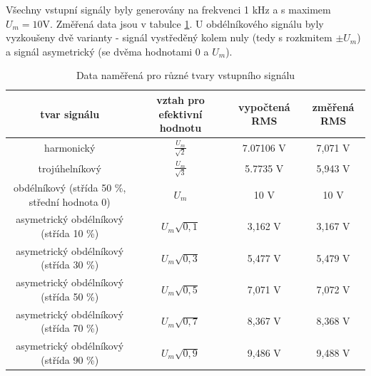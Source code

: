 \documentclass[twoside]{article}
\begin{document}
Všechny vstupní signály byly generovány na frekvenci 1 kHz a s maximem $U_m = 10 \si{\volt}$.
Změřená data jsou v tabulce \ref{tab:prubehy}. U obdélníkového signálu byly vyzkoušeny dvě
varianty - signál vystředěný kolem nuly (tedy s rozkmitem $\pm U_m$)
a signál asymetrický (se dvěma hodnotami 0 a $U_m$).

\begin{table}[h]
    \centering
    \begin{tabular}{c|c|c|c}
        tvar signálu & vztah pro efektivní hodnotu & vypočtená RMS & změřená RMS \\ \hline
        harmonický & $\frac{U_m}{\sqrt{2}}$ & 7.07106 \si{\volt} & 7,071 \si{\volt} \\
        trojúhelníkový & $\frac{U_m}{\sqrt{3}}$ & 5.7735 \si{\volt} & 5,943 \si{\volt} \\
        obdélníkový (střída 50 \%, střední hodnota 0) & $U_m$ & 10 \si{\volt} & 10 \si{\volt} \\
        asymetrický obdélníkový (střída 10 \%) & $U_m \sqrt{0,1}$ & 3,162 \si{\volt} & 3,167 \si{\volt} \\
        asymetrický obdélníkový (střída 30 \%) & $U_m \sqrt{0,3}$ & 5,477 \si{\volt} & 5,479 \si{\volt} \\
        asymetrický obdélníkový (střída 50 \%) & $U_m \sqrt{0,5}$ & 7,071 \si{\volt} & 7,072 \si{\volt} \\
        asymetrický obdélníkový (střída 70 \%) & $U_m \sqrt{0,7}$ & 8,367 \si{\volt} & 8,368 \si{\volt} \\
        asymetrický obdélníkový (střída 90 \%) & $U_m \sqrt{0,9}$ & 9,486 \si{\volt} & 9,488 \si{\volt} 
    \end{tabular}
    \caption{Data naměřená pro různé tvary vstupního signálu}
    \label{tab:prubehy}
\end{table}
\end{document}
